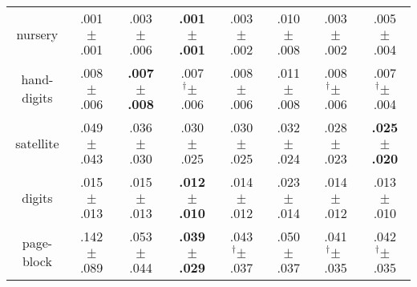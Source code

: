 \begin{tabular}{|c|ccccccc|}
nursery & .001$^{\phantom{\dag}}\pm^{\phantom{\dag}}$.001\cellcolor{green!38} & .003$^{\phantom{\dag}}\pm^{\phantom{\dag}}$.006\cellcolor{green!21} & \textbf{.001$^{\phantom{\dag}}\pm^{\phantom{\dag}}$.001}\cellcolor{green!40} & .003$^{\phantom{\dag}}\pm^{\phantom{\dag}}$.002\cellcolor{green!23} & .010$^{\phantom{\dag}}\pm^{\phantom{\dag}}$.008\cellcolor{red!40} & .003$^{\phantom{\dag}}\pm^{\phantom{\dag}}$.002\cellcolor{green!23} & .005$^{\phantom{\dag}}\pm^{\phantom{\dag}}$.004\cellcolor{green!2} \\
hand-digits & .008$^{\phantom{\dag}}\pm^{\phantom{\dag}}$.006\cellcolor{green!28} & \textbf{.007$^{\phantom{\dag}}\pm^{\phantom{\dag}}$.008}\cellcolor{green!40} & .007$^{\dag}\pm^{\phantom{\dag}}$.006\cellcolor{green!37} & .008$^{\phantom{\dag}}\pm^{\phantom{\dag}}$.006\cellcolor{green!28} & .011$^{\phantom{\dag}}\pm^{\phantom{\dag}}$.008\cellcolor{red!40} & .008$^{\dag}\pm^{\phantom{\dag}}$.006\cellcolor{green!28} & .007$^{\dag}\pm^{\phantom{\dag}}$.004\cellcolor{green!37} \\
satellite & .049$^{\phantom{\dag}}\pm^{\phantom{\dag}}$.043\cellcolor{red!40} & .036$^{\phantom{\dag}}\pm^{\phantom{\dag}}$.030\cellcolor{green!5} & .030$^{\phantom{\dag}}\pm^{\phantom{\dag}}$.025\cellcolor{green!24} & .030$^{\phantom{\dag}}\pm^{\phantom{\dag}}$.025\cellcolor{green!23} & .032$^{\phantom{\dag}}\pm^{\phantom{\dag}}$.024\cellcolor{green!16} & .028$^{\phantom{\dag}}\pm^{\phantom{\dag}}$.023\cellcolor{green!31} & \textbf{.025$^{\phantom{\dag}}\pm^{\phantom{\dag}}$.020}\cellcolor{green!40} \\
digits & .015$^{\phantom{\dag}}\pm^{\phantom{\dag}}$.013\cellcolor{green!19} & .015$^{\phantom{\dag}}\pm^{\phantom{\dag}}$.013\cellcolor{green!15} & \textbf{.012$^{\phantom{\dag}}\pm^{\phantom{\dag}}$.010}\cellcolor{green!40} & .014$^{\phantom{\dag}}\pm^{\phantom{\dag}}$.012\cellcolor{green!23} & .023$^{\phantom{\dag}}\pm^{\phantom{\dag}}$.014\cellcolor{red!40} & .014$^{\phantom{\dag}}\pm^{\phantom{\dag}}$.012\cellcolor{green!25} & .013$^{\phantom{\dag}}\pm^{\phantom{\dag}}$.010\cellcolor{green!31} \\
page-block & .142$^{\phantom{\dag}}\pm^{\phantom{\dag}}$.089\cellcolor{red!40} & .053$^{\phantom{\dag}}\pm^{\phantom{\dag}}$.044\cellcolor{green!29} & \textbf{.039$^{\phantom{\dag}}\pm^{\phantom{\dag}}$.029}\cellcolor{green!40} & .043$^{\dag}\pm^{\phantom{\dag}}$.037\cellcolor{green!37} & .050$^{\phantom{\dag}}\pm^{\phantom{\dag}}$.037\cellcolor{green!31} & .041$^{\dag}\pm^{\phantom{\dag}}$.035\cellcolor{green!38} & .042$^{\dag}\pm^{\phantom{\dag}}$.035\cellcolor{green!38} \\

\end{tabular}
